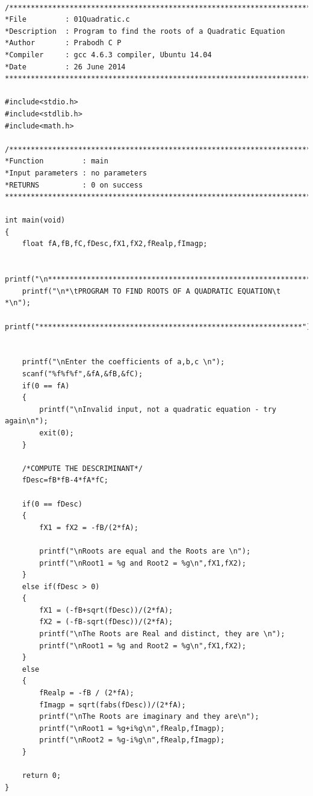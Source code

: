 \documentclass[a4paper]{report}
\begin{document}
\begin{Verbatim}

/***************************************************************************
*File         : 01Quadratic.c
*Description  : Program to find the roots of a Quadratic Equation
*Author       : Prabodh C P
*Compiler     : gcc 4.6.3 compiler, Ubuntu 14.04
*Date         : 26 June 2014
***************************************************************************/

#include<stdio.h>
#include<stdlib.h>
#include<math.h>

/***************************************************************************
*Function         :	main
*Input parameters :	no parameters
*RETURNS          :	0 on success
***************************************************************************/

int main(void)
{
	float fA,fB,fC,fDesc,fX1,fX2,fRealp,fImagp;

	printf("\n*************************************************************");
	printf("\n*\tPROGRAM TO FIND ROOTS OF A QUADRATIC EQUATION\t    *\n");
	printf("*************************************************************");


	printf("\nEnter the coefficients of a,b,c \n");
	scanf("%f%f%f",&fA,&fB,&fC);
	if(0 == fA)
	{
		printf("\nInvalid input, not a quadratic equation - try again\n");
		exit(0);
	}

	/*COMPUTE THE DESCRIMINANT*/
	fDesc=fB*fB-4*fA*fC;

	if(0 == fDesc)
	{
		fX1 = fX2 = -fB/(2*fA);

		printf("\nRoots are equal and the Roots are \n");
		printf("\nRoot1 = %g and Root2 = %g\n",fX1,fX2);
	}
	else if(fDesc > 0)
	{
		fX1 = (-fB+sqrt(fDesc))/(2*fA);
		fX2 = (-fB-sqrt(fDesc))/(2*fA);
		printf("\nThe Roots are Real and distinct, they are \n");
		printf("\nRoot1 = %g and Root2 = %g\n",fX1,fX2);
	}
	else
	{
		fRealp = -fB / (2*fA);
		fImagp = sqrt(fabs(fDesc))/(2*fA);
		printf("\nThe Roots are imaginary and they are\n");
		printf("\nRoot1 = %g+i%g\n",fRealp,fImagp);
		printf("\nRoot2 = %g-i%g\n",fRealp,fImagp);
	}

	return 0;
}
\end{Verbatim}

\pagebreak
\end{document}
